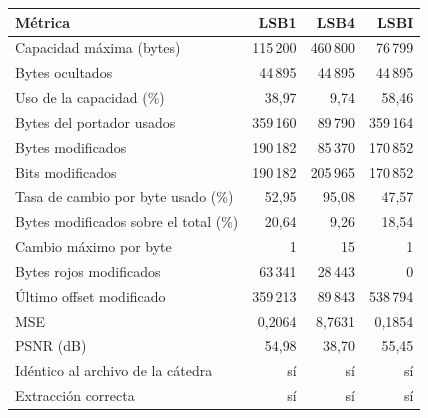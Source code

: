 \begin{tabular}{lrrr}
\toprule
Métrica & LSB1 & LSB4 & LSBI \\
\midrule
Capacidad máxima (bytes) & 115\,200 & 460\,800 & 76\,799 \\
Bytes ocultados & 44\,895 & 44\,895 & 44\,895 \\
Uso de la capacidad (\%) & 38{,}97 & 9{,}74 & 58{,}46 \\
Bytes del portador usados & 359\,160 & 89\,790 & 359\,164 \\
Bytes modificados & 190\,182 & 85\,370 & 170\,852 \\
Bits modificados & 190\,182 & 205\,965 & 170\,852 \\
Tasa de cambio por byte usado (\%) & 52{,}95 & 95{,}08 & 47{,}57 \\
Bytes modificados sobre el total (\%) & 20{,}64 & 9{,}26 & 18{,}54 \\
Cambio máximo por byte & 1 & 15 & 1 \\
Bytes rojos modificados & 63\,341 & 28\,443 & 0 \\
Último offset modificado & 359\,213 & 89\,843 & 538\,794 \\
MSE & 0{,}2064 & 8{,}7631 & 0{,}1854 \\
PSNR (dB) & 54{,}98 & 38{,}70 & 55{,}45 \\
Idéntico al archivo de la cátedra & sí & sí & sí \\
Extracción correcta & sí & sí & sí \\
\bottomrule
\end{tabular}
